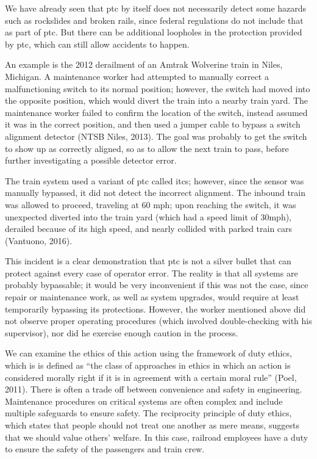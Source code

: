 \documentclass[11pt, titlepage]{article}
\begin{document}
We have already seen that \gls{ptc} by itself does not necessarily detect some
hazards such as rockslides and broken rails, since federal regulations do not
include that as part of \gls{ptc}. But there can be additional loopholes in the
protection provided by \gls{ptc}, which can still allow accidents to happen.

An example is the 2012 derailment of an Amtrak Wolverine train in Niles, Michigan.
A maintenance worker had attempted to manually correct a malfunctioning switch to its
normal position; however, the switch had moved into the opposite position, which would
divert the train into a nearby train yard. The maintenance worker failed to confirm the
location of the switch, instead assumed it was in the correct position, and then used a
jumper cable to bypass a switch
alignment detector (NTSB Niles, 2013). The goal was probably to get the switch to show up as
correctly aligned, so as to allow the next train to pass, before further
investigating a possible detector error.

The train system used a variant of \gls{ptc} called \gls{itcs}; however, since the
sensor was manually bypassed, it did not detect the incorrect alignment. The inbound
train was allowed to proceed, traveling at 60 mph; upon reaching the switch, it was
unexpected diverted into the train yard (which had a speed limit of 30mph), derailed
because of its high speed, and nearly collided with parked train cars (Vantuono,
2016).

This incident is a clear demonstration that \gls{ptc} is not a silver bullet that
can protect against every case of operator error. The reality is that all systems
are probably bypassable; it would be very inconvenient if this was not the case,
since repair or maintenance work, as well as system upgrades, would require at least
temporarily bypassing its protections. However, the worker mentioned above did not
observe proper operating procedures (which involved double-checking with his
supervisor), nor did he exercise enough caution in the process.

We can examine the ethics of this action using the framework of duty ethics, which
is is defined as ``the class of approaches in ethics in which an action is
considered morally right if it is in agreement with a certain moral rule'' (Poel,
2011). There is often a trade off between convenience and safety in engineering.
Maintenance procedures on critical systems are often complex and include multiple
safeguards to ensure safety. The reciprocity principle of duty ethics, which states
that people should not treat one another as mere means, suggests that we should
value others’ welfare. In this case, railroad employees have a duty to ensure the
safety of the passengers and train crew.
\end{document}

